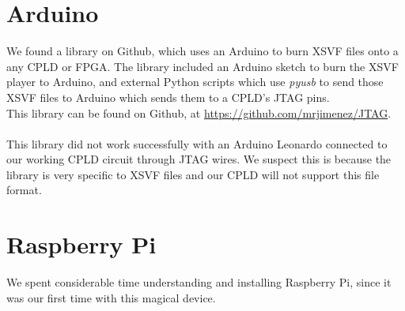 \documentclass[11pt]{article}
\begin{document}
\section*{Arduino}
We found a library on Github, which uses an Arduino to burn XSVF files onto a any CPLD or FPGA. The library included an Arduino sketch to burn the XSVF player to Arduino, and external Python scripts which use \textsl{pyusb} to send those XSVF files to Arduino which sends them to a CPLD's JTAG pins.\\
This library can be found on Github, at \href{https://github.com/mrjimenez/JTAG}{https://github.com/mrjimenez/JTAG}.\\\\
This library did not work successfully with an Arduino Leonardo connected to our working CPLD circuit through JTAG wires. We suspect this is because the library is very specific to XSVF files and our CPLD will not support this file format.
\section*{Raspberry Pi}
We spent considerable time understanding and installing Raspberry Pi, since it was our first time with this magical device.
\end{document}
